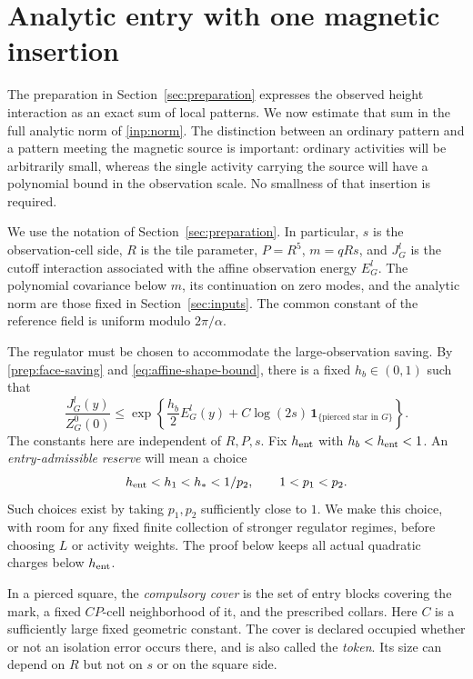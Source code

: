 \section{Analytic entry with one magnetic insertion}
\label{sec:entry}

The preparation in Section~\ref{sec:preparation} expresses the observed
height interaction as an exact sum of local patterns. We now estimate
that sum in the full analytic norm of \eqref{inp:norm}. The distinction
between an ordinary pattern and a pattern meeting the magnetic source
is important: ordinary activities will be arbitrarily small, whereas
the single activity carrying the source will have a polynomial bound
in the observation scale. No smallness of that insertion is required.

We use the notation of Section~\ref{sec:preparation}. In particular,
$s$ is the observation-cell side, $R$ is the tile parameter,
$P=R^5$, $m=qRs$, and $J_G^l$ is the cutoff interaction associated
with the affine observation energy $E_G^l$. The polynomial covariance
below $m$, its continuation on zero modes, and the analytic norm are
those fixed in Section~\ref{sec:inputs}. The common constant of the
reference field is uniform modulo $2\pi/\alpha$.

The regulator must be chosen to accommodate the large-observation
saving. By \eqref{prep:face-saving} and
\eqref{eq:affine-shape-bound}, there is a fixed $h_b\in(0,1)$ such
that
\[
 \frac{J_G^l(y)}{Z_G^0(0)}
 \le \exp\left\{\frac{h_b}{2}E_G^l(y)
       +C\log(2s)\,
            \mathbf 1_{\{\text{pierced star in }G\}}\right\}.
\]
The constants here are independent of $R,P,s$. Fix
$h_{\rm ent}$ with $h_b<h_{\rm ent}<1$. An
\emph{entry-admissible reserve} will mean a choice
\begin{equation}\label{eq:entry-admissible-reserve}
 h_{\rm ent}<h_1<h_*<1/p_2,
                    \qquad 1<p_1<p_2.
\end{equation}
Such choices exist by taking $p_1,p_2$ sufficiently close to $1$.
We make this choice, with room for any fixed finite collection of
stronger regulator regimes, before choosing $L$ or activity weights.
The proof below keeps all actual quadratic charges below
$h_{\rm ent}$.

In a pierced square, the \emph{compulsory cover} is the set of entry
blocks covering the mark, a fixed $CP$-cell neighborhood of it,
and the prescribed collars. Here $C$ is a sufficiently large fixed
geometric constant. The cover is declared occupied whether or not
an isolation error occurs there, and is also called the \emph{token}.
Its size can depend on $R$ but not on $s$ or on the square side.

